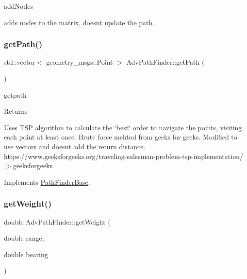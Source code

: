 add\+Nodes 

adds nodes to the matrix, doesnt update the path. \mbox{\label{classAdvPathFinder_a4abff5170d4b63a4fa98262d90e14f32}} 
\subsubsection{\texorpdfstring{get\+Path()}{getPath()}}
{\footnotesize\ttfamily std\+::vector$<$ geometry\+\_\+msgs\+::\+Point $>$ Adv\+Path\+Finder\+::get\+Path (\begin{DoxyParamCaption}{ }\end{DoxyParamCaption})\hspace{0.3cm}{\ttfamily [virtual]}}



getpath 

\begin{DoxyReturn}{Returns}

\end{DoxyReturn}
Uses T\+SP algorithm to calculate the \char`\"{}best\char`\"{} order to navigate the points, visiting each point at least once. Brute force mehtod from geeks for geeks. Modified to use vectors and doesnt add the return distance. https\+://www.\+geeksforgeeks.\+org/traveling-\/salesman-\/problem-\/tsp-\/implementation/$>$geeksforgeeks

Implements \hyperlink{classPathFinderBase_aa254c2b8392f028898f691920341caa0}{Path\+Finder\+Base}.

\mbox{\label{classAdvPathFinder_ae213e34f7092c587d40afd8f316c31eb}} 
\subsubsection{\texorpdfstring{get\+Weight()}{getWeight()}}
{\footnotesize\ttfamily double Adv\+Path\+Finder\+::get\+Weight (\begin{DoxyParamCaption}\item[{double}]{range,  }\item[{double}]{bearing }\end{DoxyParamCaption})\hspace{0.3cm}{\ttfamily [protected]}}



